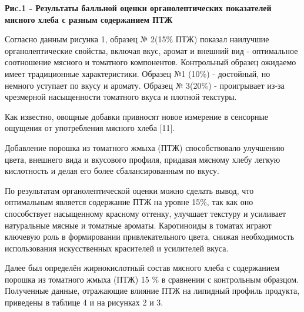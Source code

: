 {\bfseries Риc.1 - Результаты балльной оценки органолептических показателей мясного хлеба с разным содержанием ПТЖ}

\begin{multicols}{2}
Согласно данным рисунка 1, образец № 2(15\% ПТЖ) показал наилучшие
органолептические свойства, включая вкус, аромат и внешний вид -
оптимальное соотношение мясного и томатного компонентов. Контрольный
образец ожидаемо имеет традиционные характеристики. Образец №1 (10\%) -
достойный, но немного уступает по вкусу и аромату. Образец № 3(20\%) -
проигрывает из-за чрезмерной насыщенности томатного вкуса и плотной
текстуры.

Как известно, овощные добавки привносят новое измерение в сенсорные
ощущения от употребления мясного хлеба {[}11{]}.

Добавление порошка из томатного жмыха (ПТЖ) способствовало улучшению
цвета, внешнего вида и вкусового профиля, придавая мясному хлебу легкую
кислотность и делая его более сбалансированным по вкусу.

По результатам органолептической оценки можно сделать вывод, что
оптимальным является содержание ПТЖ на уровне 15\%, так как оно
способствует насыщенному красному оттенку, улучшает текстуру и усиливает
натуральные мясные и томатные ароматы. Каротиноиды в томатах играют
ключевую роль в формировании привлекательного цвета, снижая
необходимость использования искусственных красителей и усилителей вкуса.

Далее был определён жирнокислотный состав мясного хлеба с содержанием
порошка из томатного жмыха (ПТЖ) 15 \% в сравнении с контрольным
образцом. Полученные данные, отражающие влияние ПТЖ на липидный профиль
продукта, приведены в таблице 4 и на рисунках 2 и 3.
\end{multicols}

